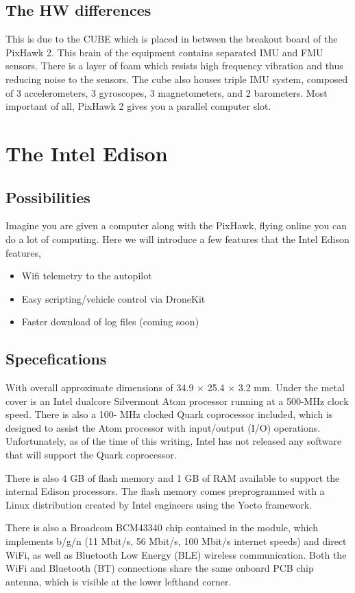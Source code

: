 \documentclass[12pt]{report}
\begin{document}
\section{The HW differences}
This is due to the CUBE which is placed in between the breakout board of the PixHawk 2. This brain of the equipment contains separated IMU and FMU sensors. There is a layer of foam which resists high frequency vibration and thus reducing noise to the sensors. The cube also houses triple IMU system, composed of 3 accelerometers, 3 gyroscopes, 3 magnetometers, and 2 barometers. Most important of all, PixHawk 2 gives you a parallel computer slot. 


\chapter{The Intel Edison}
\section{Possibilities} 
 Imagine you are given a computer along with the PixHawk, flying online you can do a lot of computing. Here we will introduce  a few features that the Intel Edison features,
 \begin{itemize}
 \item Wifi telemetry to the autopilot
 \item Easy scripting/vehicle control via DroneKit
 \item Faster download of log files (coming soon)
 \end{itemize}

\section{Specefications}
 With overall
approximate dimensions of 34.9 × 25.4 × 3.2 mm. Under the metal cover is an Intel dualcore
Silvermont Atom processor running at a 500-MHz clock speed. There is also a 100-
MHz clocked Quark coprocessor included, which is designed to assist the Atom processor
with input/output (I/O) operations. Unfortunately, as of the time of this writing, Intel has
not released any software that will support the Quark coprocessor.

There is also 4 GB of flash memory and 1 GB of RAM available to support the internal
Edison processors. The flash memory comes preprogrammed with a Linux distribution
created by Intel engineers using the Yocto framework.

There is also a Broadcom BCM43340 chip contained in the module, which implements
b/g/n (11 Mbit/s, 56 Mbit/s, 100 Mbit/s internet speeds) and direct WiFi, as well as
Bluetooth Low Energy (BLE) wireless communication. Both the WiFi and Bluetooth (BT)
connections share the same onboard PCB chip antenna, which is visible at the lower lefthand
corner.
\end{document}
